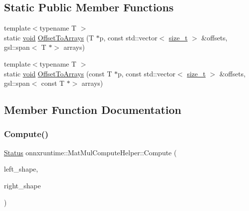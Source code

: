 \subsection*{Static Public Member Functions}
\begin{DoxyCompactItemize}
\item 
{\footnotesize template$<$typename T $>$ }\\static \mbox{\hyperlink{mlasi_8h_a88f941d423cb2a819b70a1358982b1a6}{void}} \mbox{\hyperlink{classonnxruntime_1_1MatMulComputeHelper_af6b01ebe6aa134eb78a4c326200329a5}{Offset\+To\+Arrays}} (T $\ast$p, const std\+::vector$<$ \mbox{\hyperlink{mlasi_8h_a503efbc1c6e50825320ad909366b78ab}{size\+\_\+t}} $>$ \&offsets, gsl\+::span$<$ T $\ast$$>$ arrays)
\item 
{\footnotesize template$<$typename T $>$ }\\static \mbox{\hyperlink{mlasi_8h_a88f941d423cb2a819b70a1358982b1a6}{void}} \mbox{\hyperlink{classonnxruntime_1_1MatMulComputeHelper_ab6aa8455fb8dbd8836d187e0e718a0c4}{Offset\+To\+Arrays}} (const T $\ast$p, const std\+::vector$<$ \mbox{\hyperlink{mlasi_8h_a503efbc1c6e50825320ad909366b78ab}{size\+\_\+t}} $>$ \&offsets, gsl\+::span$<$ const T $\ast$$>$ arrays)
\end{DoxyCompactItemize}


\subsection{Member Function Documentation}
\mbox{\label{classonnxruntime_1_1MatMulComputeHelper_a03b36f22431349e37fd118581fa4699d}} 
\subsubsection{\texorpdfstring{Compute()}{Compute()}}
{\footnotesize\ttfamily \mbox{\hyperlink{classonnxruntime_1_1common_1_1Status}{Status}} onnxruntime\+::\+Mat\+Mul\+Compute\+Helper\+::\+Compute (\begin{DoxyParamCaption}\item[{const \mbox{\hyperlink{classonnxruntime_1_1TensorShape}{Tensor\+Shape}} \&}]{left\+\_\+shape,  }\item[{const \mbox{\hyperlink{classonnxruntime_1_1TensorShape}{Tensor\+Shape}} \&}]{right\+\_\+shape }\end{DoxyParamCaption})\hspace{0.3cm}{\ttfamily [inline]}}

